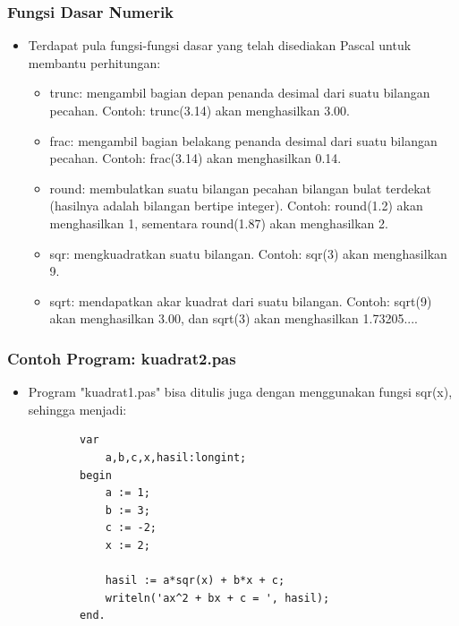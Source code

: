 \documentclass{beamer}
\begin{document}
\begin{frame}
\frametitle{Fungsi Dasar Numerik}
\begin{itemize}
	\item Terdapat pula fungsi-fungsi dasar yang telah disediakan Pascal untuk membantu perhitungan:
	\begin{itemize}
		\item trunc: mengambil bagian depan penanda desimal dari suatu bilangan pecahan. Contoh: trunc(3.14) akan menghasilkan 3.00.
		\item frac: mengambil bagian belakang penanda desimal dari suatu bilangan pecahan. Contoh: frac(3.14) akan menghasilkan 0.14.
		\item round: membulatkan suatu bilangan pecahan bilangan bulat terdekat (hasilnya adalah bilangan bertipe integer). Contoh: round(1.2) akan menghasilkan 1, sementara round(1.87) akan menghasilkan 2.
		\item sqr: mengkuadratkan suatu bilangan. Contoh: sqr(3) akan menghasilkan 9.
		\item sqrt: mendapatkan akar kuadrat dari suatu bilangan. Contoh: sqrt(9) akan menghasilkan 3.00, dan sqrt(3) akan menghasilkan 1.73205....
	\end{itemize}
\end{itemize}
\end{frame}

\begin{frame}[fragile]
\frametitle{Contoh Program: kuadrat2.pas}
\begin{itemize}
	\item Program "kuadrat1.pas" bisa ditulis juga dengan menggunakan fungsi sqr(x), sehingga menjadi:
	\begin{lstlisting}
		var
		    a,b,c,x,hasil:longint;
		begin
		    a := 1;
		    b := 3;
		    c := -2;
		    x := 2;	    

		    hasil := a*sqr(x) + b*x + c;
		    writeln('ax^2 + bx + c = ', hasil);
		end.
	\end{lstlisting}
\end{itemize}
\end{frame}
\end{document}
